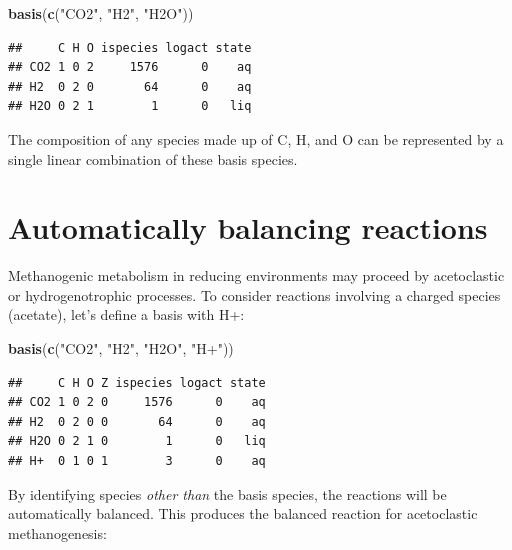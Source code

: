 \documentclass[]{tufte-book}
\newenvironment{Shaded}{}{}
\newcommand{\KeywordTok}[1]{\textcolor[rgb]{0.00,0.44,0.13}{\textbf{#1}}}
\newcommand{\DecValTok}[1]{\textcolor[rgb]{0.25,0.63,0.44}{#1}}
\newcommand{\StringTok}[1]{\textcolor[rgb]{0.25,0.44,0.63}{#1}}
\newcommand{\OperatorTok}[1]{\textcolor[rgb]{0.40,0.40,0.40}{#1}}
\newcommand{\NormalTok}[1]{#1}
\begin{document}
\begin{Shaded}
\begin{Highlighting}[]
\KeywordTok{basis}\NormalTok{(}\KeywordTok{c}\NormalTok{(}\StringTok{"CO2"}\NormalTok{, }\StringTok{"H2"}\NormalTok{, }\StringTok{"H2O"}\NormalTok{))}
\end{Highlighting}
\end{Shaded}

\begin{verbatim}
##     C H O ispecies logact state
## CO2 1 0 2     1576      0    aq
## H2  0 2 0       64      0    aq
## H2O 0 2 1        1      0   liq
\end{verbatim}

The composition of any species made up of C, H, and O can be represented
by a single linear combination of these basis species.

\section{Automatically balancing
reactions}\label{automatically-balancing-reactions}

Methanogenic metabolism in reducing environments may proceed by
acetoclastic or hydrogenotrophic processes. To consider reactions
involving a charged species (acetate), let's define a basis with H+:

\begin{Shaded}
\begin{Highlighting}[]
\KeywordTok{basis}\NormalTok{(}\KeywordTok{c}\NormalTok{(}\StringTok{"CO2"}\NormalTok{, }\StringTok{"H2"}\NormalTok{, }\StringTok{"H2O"}\NormalTok{, }\StringTok{"H+"}\NormalTok{))}
\end{Highlighting}
\end{Shaded}

\begin{verbatim}
##     C H O Z ispecies logact state
## CO2 1 0 2 0     1576      0    aq
## H2  0 2 0 0       64      0    aq
## H2O 0 2 1 0        1      0   liq
## H+  0 1 0 1        3      0    aq
\end{verbatim}

By identifying species \emph{other than} the basis species, the
reactions will be automatically balanced. This produces the balanced
reaction for acetoclastic methanogenesis:

\begin{Shaded}
\end{Shaded}
\end{document}
